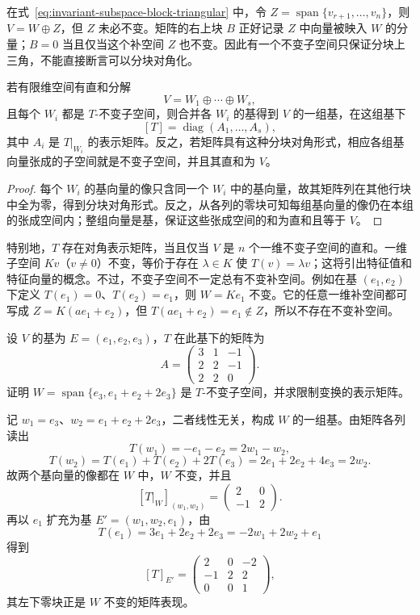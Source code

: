 在式~\eqref{eq:invariant-subspace-block-triangular} 中，令 $Z=\operatorname{span}\{v_{r+1},\ldots,v_n\}$，则 $V=W\oplus Z$，但 $Z$ 未必不变。矩阵的右上块 $B$ 正好记录 $Z$ 中向量被映入 $W$ 的分量；$B=0$ 当且仅当这个补空间 $Z$ 也不变。因此有一个不变子空间只保证分块上三角，不能直接断言可以分块对角化。

\begin{corollary}
\label{cor:invariant-direct-sum-block-diagonal}
若有限维空间有直和分解
\[
    V=W_1\oplus\cdots\oplus W_s,
\]
且每个 $W_i$ 都是 $T$-不变子空间，则合并各 $W_i$ 的基得到 $V$ 的一组基，在这组基下
\begin{equation}
\label{eq:invariant-direct-sum-block-diagonal}
    [T]=\operatorname{diag}(A_1,\ldots,A_s),
\end{equation}
其中 $A_i$ 是 $T|_{W_i}$ 的表示矩阵。反之，若矩阵具有这种分块对角形式，相应各组基向量张成的子空间就是不变子空间，并且其直和为 $V$。
\end{corollary}

\begin{proof}
每个 $W_i$ 的基向量的像只含同一个 $W_i$ 中的基向量，故其矩阵列在其他行块中全为零，得到分块对角形式。反之，从各列的零块可知每组基向量的像仍在本组的张成空间内；整组向量是基，保证这些张成空间的和为直和且等于 $V$。
\end{proof}

特别地，$T$ 存在对角表示矩阵，当且仅当 $V$ 是 $n$ 个一维不变子空间的直和。一维子空间 $K v$（$v\ne0$）不变，等价于存在 $\lambda\in K$ 使 $T(v)=\lambda v$；这将引出特征值和特征向量的概念。不过，不变子空间不一定总有不变补空间。例如在基 $(e_1,e_2)$ 下定义 $T(e_1)=0$、$T(e_2)=e_1$，则 $W=K e_1$ 不变。它的任意一维补空间都可写成 $Z=K(ae_1+e_2)$，但 $T(ae_1+e_2)=e_1\notin Z$，所以不存在不变补空间。

\begin{example}
\label{ex:invariant-subspace-textbook}
设 $V$ 的基为 $E=(e_1,e_2,e_3)$，$T$ 在此基下的矩阵为
\[
    A=\begin{pmatrix}
        3&1&-1\\
        2&2&-1\\
        2&2&0
    \end{pmatrix}.
\]
证明 $W=\operatorname{span}\{e_3,e_1+e_2+2e_3\}$ 是 $T$-不变子空间，并求限制变换的表示矩阵。
\end{example}

\begin{solve}
记 $w_1=e_3$、$w_2=e_1+e_2+2e_3$，二者线性无关，构成 $W$ 的一组基。由矩阵各列读出
\[
    T(w_1)=-e_1-e_2=2w_1-w_2,
\]
\[
    T(w_2)=T(e_1)+T(e_2)+2T(e_3)
    =2e_1+2e_2+4e_3=2w_2.
\]
故两个基向量的像都在 $W$ 中，$W$ 不变，并且
\[
    [T|_W]_{(w_1,w_2)}=\begin{pmatrix}2&0\\-1&2\end{pmatrix}.
\]
再以 $e_1$ 扩充为基 $E'=(w_1,w_2,e_1)$，由
\[
    T(e_1)=3e_1+2e_2+2e_3=-2w_1+2w_2+e_1
\]
得到
\[
    [T]_{E'}=\begin{pmatrix}
        2&0&-2\\
        -1&2&2\\
        0&0&1
    \end{pmatrix},
\]
其左下零块正是 $W$ 不变的矩阵表现。
\end{solve}

